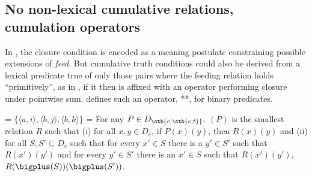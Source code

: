 \documentclass[output=paper]{langscibook}
\begin{document}
\subsection{No non-lexical cumulative relations, cumulation operators}\label{has-sch:sec:2.2}

In , the closure condition is encoded as a meaning postulate constraining possible extensions of \textit{feed}. But cumulative truth conditions could also be derived from a lexical predicate true of only those pairs where the feeding relation holds ``primitively'', as in , if it then is affixed with an operator performing closure under pointwise sum.  defines such an operator, **, for binary predicates. 


\ea
\ea \label{has-sch:2a}  = $\{\langle a, i\rangle, \langle b, j\rangle, \langle b, k\rangle\}$ \hfill {} = 
\ex \label{has-sch:2b} For any $P \in  D_{\stb{e, \stb{e, t}}},$ \sib{**}$(P)$ is the smallest relation $R$ such that (i) for all $x, y \in D_{e}$, if $P(x)(y)$, then $R(x)(y)$  and (ii) for all $S, S' \subseteq D_{e}$ such that for every $x' \in S$ there is a $y' \in S'$ such that $R(x')(y')$ and for every $y' \in S'$ there is an $x' \in S$ such that $R(x')(y') $, $R(\bigplus(S))(\bigplus(S'))$.
\z\z
\end{document}
